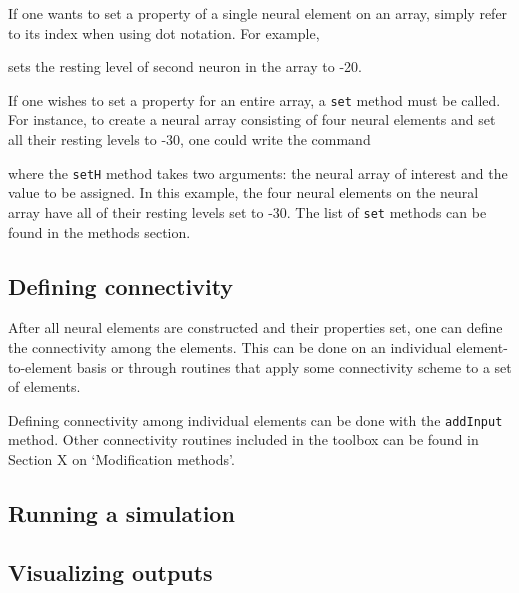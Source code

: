 \documentclass[phd, 12pt, doublespace, online]{fauthesis}
\begin{document}
\bigskip
If one wants to set a property of a single neural element on an array, simply refer to its index when using dot notation. For example,

\bigskip
{}

\bigskip
\noindent sets the resting level of second neuron in the array to -20. 

\bigskip
If one wishes to set a property for an entire array, a {\tt set} method must be called. For instance, to create a neural array consisting of four neural elements and set all their resting levels to -30, one could write the command

\bigskip
{}

\bigskip
\noindent where the {\tt setH} method takes two arguments: the neural array of interest and the value to be assigned. In this example, the four neural elements on the neural array have all of their resting levels set to -30. The list of {\tt set} methods can be found in the methods section. 


\subsection{Defining connectivity}

After all neural elements are constructed and their properties set, one can define the connectivity among the elements. This can be done on an individual element-to-element basis or through routines that apply some connectivity scheme to a set of elements. 

Defining connectivity among individual elements can be done with the {\tt addInput} method. Other connectivity routines included in the toolbox can be found in Section X on `Modification methods'.

\subsection{Running a simulation}

\subsection{Visualizing outputs}
\end{document}

